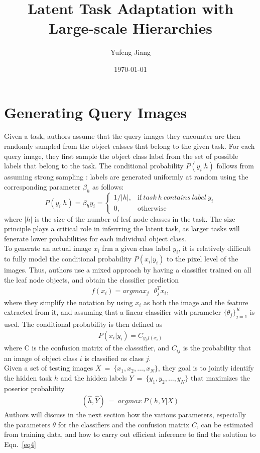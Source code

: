 \documentclass[10pt,twocolumn,letterpaper]{article}
\begin{document}
\title{Latent Task Adaptation with Large-scale Hierarchies}
\author{Yufeng Jiang}
\date{\today}
\maketitle
\section{Generating Query Images}
Given a task, authors assume that the query images they encounter are then randomly sampled from the object calsses that belong to the given task. For each query image, they first sample the object class label from the set of possible labels that belong to the task. The conditional probability $P(y_i|h)$ follows from assuming strong sampling \cite{Generalization}: labels are generated uniformly at random using the corresponding parameter $\beta _h$ as follows: \\
\[
 P(y_i|h) = \beta _hy_i = 
\begin{cases}
1/|h|, & \text{if}~task~h~contains~label~y_i \\
0, & \text{otherwise} \tag{1}  
\end{cases}
\]
where $|h|$ is the size of the number of lesf node classes in the task. The size principle plays a critical role in inferrring the latent task, as larger tasks will fenerate lower probabilities for each individual object class.\\
\indent To generate an actual image $x_i$ frm a given class label $y_i$, it  is relatively difficult to fully model the conditional probability $P(x_i|y_i)$ to the pixel level of the images. Thus, authors use a mixed approach by having a classifier trained on all the leaf node objects, and obtain the classifier prediction\\
\begin{gather*}
f(x_i) = argmax _j~~~\theta_j^T x_i, \tag{2}
\end{gather*}
where they simplify the notation by using $x_i$ as both the image and the feature extracted from it, and assuming that a linear classifier with parameter $\{\theta_j\}_{j=1}^K$ is used. The conditional probability is then defined as\\
\begin{gather*}
P(x_i|y_i)=C_{y_if(x_i)} \tag{3}
\end{gather*}
where C is the confusion matrix of the classsifier, and $C_{ij}$ is the probability that an image of object class $i$ is classified as class $j$.\\
\indent Given a set of testing images $X~=~\{x_1,x_2,\dots,x_N\}$, they goal is to jointly identify the hidden task $h$ and the hidden labels $Y~=~\{y_1,y_2,\dots,y_N\}$ that maximizes the poserior probability\\
\begin{gather*}
(\hat{h},\hat{Y})~=~argmax~P(h,Y|X) \tag{4}
\label{eq4}
\end{gather*}
Authors will discuss in the next section how the various parameters, especially the parameters $\theta$ for the classifiers and the confusion matrix $C$, can be estimated from training data, and how to carry out efficient inference to find the solution to Eqn.~\ref{eq4}
\end{document}
